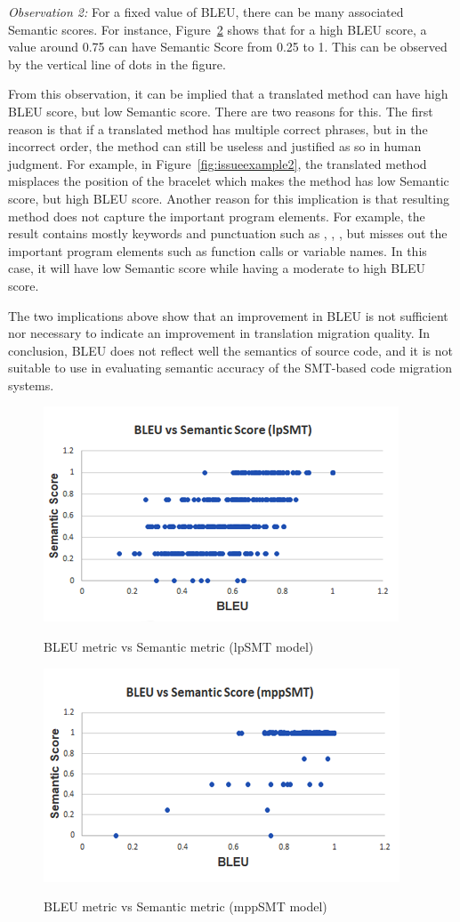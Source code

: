 \emph{Observation 2:} For a fixed value of BLEU, there can be many
associated Semantic scores. For instance,
Figure~\ref{fig:BleuSemMppSMT} shows that for a high BLEU score, a
value around 0.75 can have Semantic Score from 0.25 to 1. This can be
observed by the vertical line of dots in the figure.

From this observation, it can be implied that a translated method can
have high BLEU score, but low Semantic score. There are two reasons
for this. The first reason is that if a translated method has multiple
correct phrases, but in the incorrect order, the method can still be
useless and justified as so in human judgment.
%
For example, in Figure~\ref{fig:issueexample2}, the translated method
misplaces the position of the bracelet which makes the method has low
Semantic score, but high BLEU score. Another reason for this
implication is that resulting method does not capture the important
program elements. For example, the result contains mostly keywords and
punctuation such as , , \code{()}, but misses
out the important program elements such as function calls or variable
names. In this case, it will have low Semantic score while having
a moderate to high BLEU score.

The two implications above show that an improvement in BLEU is not
sufficient nor necessary to indicate an improvement in translation
migration quality. In conclusion, BLEU does not reflect well the
semantics of source code, and it is not suitable to use in evaluating
semantic accuracy of the SMT-based code migration systems.


\begin{figure}
\caption{BLEU metric vs Semantic metric (lpSMT model)}
\centering
\includegraphics{img/bleuvssemantic_lpSMT.png}
\label{fig:BleuSemlpSMT}
\end{figure}

\begin{figure}
\caption{BLEU metric vs Semantic metric (mppSMT model)}
\centering
\includegraphics{img/bleuvssemantic_mppSMT.png}
\label{fig:BleuSemMppSMT}
\end{figure}

